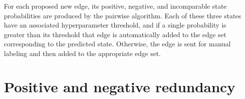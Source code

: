 For each proposed new edge, its positive, negative, and incomparable state
  probabilities are produced by the pairwise algorithm.
Each of these three states have an associated hyperparameter threshold, and if
  a single probability is greater than its threshold that edge is automatically
  added to the edge set corresponding to the predicted state.
Otherwise, the edge is sent for manual labeling and then added to the
  appropriate edge set.

\section{Positive and negative redundancy}\label{sec:redun}

